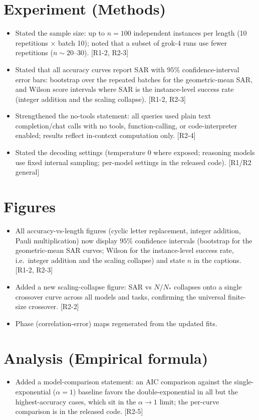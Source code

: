 \documentclass[11pt]{article}
\newcommand{\rf}[1]{\hfill\textnormal{\small[#1]}}
\begin{document}
\section{Experiment (Methods)}
\begin{itemize}
  \item Stated the sample size: up to $n=100$ independent instances per length (10 repetitions
        $\times$ batch 10); noted that a subset of grok-4 runs use fewer repetitions
        ($n\sim20$--$30$). \rf{R1-2, R2-3}
  \item Stated that all accuracy curves report SAR with $95\%$ confidence-interval error bars:
        bootstrap over the repeated batches for the geometric-mean SAR, and Wilson score
        intervals where SAR is the instance-level success rate (integer addition and the scaling
        collapse). \rf{R1-2, R2-3}
  \item Strengthened the no-tools statement: all queries used plain text completion/chat calls
        with no tools, function-calling, or code-interpreter enabled; results reflect in-context
        computation only. \rf{R2-4}
  \item Stated the decoding settings (temperature 0 where exposed; reasoning models use fixed
        internal sampling; per-model settings in the released code). \rf{R1/R2 general}
\end{itemize}

\section{Figures}
\begin{itemize}
  \item All accuracy-vs-length figures (cyclic letter replacement, integer addition, Pauli
        multiplication) now display $95\%$ confidence intervals (bootstrap for the geometric-mean
        SAR curves; Wilson for the instance-level success rate, i.e.\ integer addition and the
        scaling collapse) and state $n$ in the captions. \rf{R1-2, R2-3}
  \item Added a new scaling-collapse figure: SAR vs $N/N_*$ collapses onto a single crossover
        curve across all models and tasks, confirming the universal finite-size crossover.
        \rf{R2-2}
  \item Phase (correlation-error) maps regenerated from the updated fits.
\end{itemize}

\section{Analysis (Empirical formula)}
\begin{itemize}
  \item Added a model-comparison statement: an AIC comparison against the single-exponential
        ($\alpha=1$) baseline favors the double-exponential in all but the highest-accuracy
        cases, which sit in the $\alpha\to1$ limit; the per-curve comparison is in the released
        code. \rf{R2-5}
\end{itemize}
\end{document}
